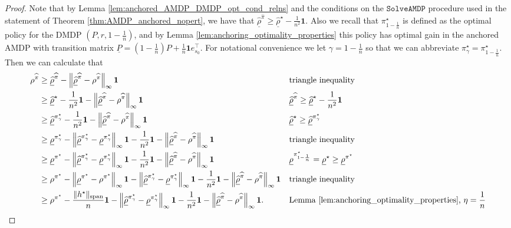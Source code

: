 \documentclass{article}
\theoremstyle{plain}
\theoremstyle{plain}
\theoremstyle{remark}
\theoremstyle{plain}
\theoremstyle{plain}
\newcommand{\pistar}{\pi^\star}
\newcommand{\one}{\mathbf{1}}
\newcommand{\pihat}{\widehat{\pi}}
\newcommand{\rhohat}{\widehat{\rho}}
\newcommand{\SolveAMDP}{\texttt{SolveAMDP}}
\newcommand{\rhohatanc}{ \underline{\rhohat}}
\newcommand{\Panc}{\underline{P}}
\newcommand{\rhoanc}{\underline{\rho}}
\begin{document}
\begin{proof}
Note that by Lemma \ref{lem:anchored_AMDP_DMDP_opt_cond_relns} and the conditions on the $\SolveAMDP$ procedure used in the statement of Theorem \ref{thm:AMDP_anchored_nopert}, we have that $\rhohatanc^{\pihat} \geq \rhohatanc^{\star} - \frac{1}{n^2}\one$. Also we recall that $\pistar_{1 - \frac{1}{n}}$ is defined as the optimal policy for the DMDP $(P, r, 1-\frac{1}{n})$, and by Lemma \ref{lem:anchoring_optimality_properties} this policy has optimal gain in the anchored AMDP with transition matrix $\Panc = (1-\frac{1}{n})P + \frac{1}{n}\one e_{s_0}^\top$.  For notational convenience we let $\gamma = 1-\frac{1}{n}$ so that we can abbreviate $\pistar_\gamma = \pistar_{1 - \frac{1}{n}}$. Then we can calculate that
    \begin{align*}
        \rho^{\pihat} & \geq \rhohatanc^{\pihat} - \infnorm{\rhohatanc^{\pihat} - \rho^{\pihat}} \one &&\text{triangle inequality} \\
        & \geq \rhohatanc^{\star} - \frac{1}{n^2}\one - \infnorm{\rhohatanc^{\pihat} - \rho^{\pihat}} \one &&\text{$\rhohatanc^{\pihat} \geq \rhohatanc^{\star} - \frac{1}{n^2}\one$} \\
        & \geq \rhohatanc^{\pistar_{\gamma}} - \frac{1}{n^2}\one - \infnorm{\rhohatanc^{\pihat} - \rho^{\pihat}} \one &&\text{$\rhohatanc^{\star} \geq \rhohatanc^{\pistar_{\gamma}} $} \\
        & \geq \rhoanc^{\pistar_{\gamma}} - \infnorm{\rhohatanc^{\pistar_{\gamma}} - \rhoanc^{\pistar_{\gamma}}} \one - \frac{1}{n^2}\one - \infnorm{\rhohatanc^{\pihat} - \rho^{\pihat}} \one &&\text{triangle inequality} \\
        & \geq \rhoanc^{\pistar}  - \infnorm{\rhohatanc^{\pistar_{\gamma}} - \rhoanc^{\pistar_{\gamma}}} \one - \frac{1}{n^2}\one - \infnorm{\rhohatanc^{\pihat} - \rho^{\pihat}} \one &&\text{$\rhoanc^{\pistar_{1-\frac{1}{n}}} = \rhoanc^\star \geq \rhoanc^{\pistar}$} \\
        & \geq \rho^{\pistar} - \infnorm{\rhoanc^{\pistar} - \rho^{\pistar}}\one - \infnorm{\rhohatanc^{\pistar_{\gamma}} - \rhoanc^{\pistar_{\gamma}}} \one - \frac{1}{n^2}\one - \infnorm{\rhohatanc^{\pihat} - \rho^{\pihat}} \one &&\text{triangle inequality} \\
        & \geq \rho^{\pistar} - \frac{\spannorm{h^\star}}{n}\one - \infnorm{\rhohatanc^{\pistar_{\gamma}} - \rhoanc^{\pistar_{\gamma}}} \one - \frac{1}{n^2}\one - \infnorm{\rhohatanc^{\pihat} - \rho^{\pihat}} \one. &&\text{Lemma \ref{lem:anchoring_optimality_properties}, $\eta = \frac{1}{n}$}
    \end{align*}
\end{proof}
\end{document}
